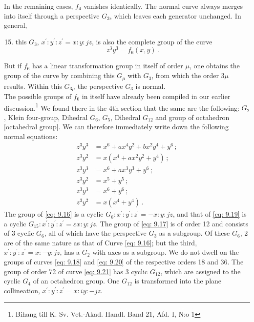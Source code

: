 \documentclass[leqno]{article}
\begin{document}
In the remaining cases, $f_4$ vanishes identically. The normal curve always merges into itself through a perspective $G_3$, which leaves each generator unchanged. In general, 
\begin{enumerate}[label=\arabic*)]
    \setcounter{enumi}{14}
    \item this $G_3$, $x^\prime: y^\prime : z^\prime = x:y:jz$, is also the complete group of the curve 
    \begin{equation}\label{eq: 9.15}
    z^3 y^3 = f_6(x, y) \, . \tag{15}
    \end{equation}
\end{enumerate}
But if $f_6$ has a linear transformation group in itself of order $\mu$, one obtains the group of the curve by combining this $G_\mu$ with $G_3$, from which the order $3\mu$ results. Within this $G_{3 \mu}$ the perspective $G_3$ is normal. \\
The possible groups of $f_6$ in itself have already been compiled in our earlier discussion.\footnote{Bihang till K. Sv. Vet.-Akad. Handl. Band 21, Afd. I, N:o 1} We found there in the 4th section that the same are the following: $G_2$, Klein four-group, Dihedral $G_6$, $G_5$, Dihedral $G_{12}$ and group of octahedron [octahedral group]. We can therefore immediately write down the following normal equations:
\begin{align}
	z^3 y^3 &= x^6 + ax^4 y^2 + bx^2 y^4 + y^6 \, ; \label{eq: 9.16} \tag{16} \\
	z^3 y^2 &= x(x^4 + ax^2 y^2 + y^4) \, ; \label{eq: 9.17} \tag{17} \\ 
	z^3 y^3 &= x^6 + a x^3 y^3 + y^6 \, ; \label{eq: 9.18} \tag{18} \\
	z^3 y^2 &= x^5 + y^5 \, ; \label{eq: 9.19} \tag{19} \\ 
	z^3 y^3 &= x^6 + y^6 \, ; \label{eq: 9.20} \tag{20} \\ 
	z^3 y^2 &= x(x^4 + y^4) \, . \label{eq: 9.21} \tag{21} 
\end{align}
The group of \eqref{eq: 9.16} is a cyclic $G_6 : x^\prime: y^\prime : z^\prime = - x : y: jz$, and that of \eqref{eq: 9.19} is a cyclic $G_{15} : x ^\prime : y^\prime : z^\prime = \varepsilon x : y : jz$. The group of \eqref{eq: 9.17} is of order 12 and consists of 3 cyclic $G_6$, all of which have the perspective $G_3$ as a subgroup. Of these $G_6$, 2 are of the same nature as that of Curve \eqref{eq: 9.16}; but the third, $x^\prime : y^\prime : z^\prime = x : -y : jz$, has a $G_2$ \guillemotright with axes\guillemotright{} as a subgroup. We do not dwell on the groups of curves \eqref{eq: 9.18} and \eqref{eq: 9.20} of the respective orders 18 and 36. The group of order 72 of curve \eqref{eq: 9.21} has 3 cyclic $G_{12}$, which are assigned to the cyclic $G_4$ of an octahedron group. One $G_{12}$ is transformed into the plane collineation, $x^\prime : y^\prime : z^\prime = x : iy : -jz$. \\
\end{document}
